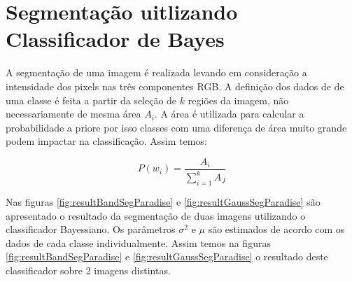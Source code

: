 \documentclass[ 
	article,			%
	11pt,				%
	oneside,			%
	a4paper,			%
	english,			%
	brazil,				%
	]{abntex2}
\begin{document}
% 
% 
% 
% 
% 

\section{Segmentação uitlizando Classificador de Bayes}
 A segmentação de uma imagem é realizada levando em
consideração a intensidade dos pixels nas três componentes RGB.
A definição dos dados de de uma classe é feita a partir da seleção de $k$
regiões da imagem, não necessariamente de mesma área $A_i$. A área é utilizada
para calcular a probabilidade a priore por isso classes com uma diferença de
área muito grande podem impactar na classificação.
Assim temos:

\begin{equation}
	P(w_i) =  \frac{A_i}{\sum_{i=1}^{k}{A_J}}
\end{equation}


Nas figuras \ref{fig:resultBandSegParadise} e \ref{fig:resultGaussSegParadise}
são apresentado o resultado da segmentação de duas imagens utilizando o
classificador Bayessiano. Os parâmetros $\sigma^2$ e $\mu$ são estimados de
acordo com os dados de cada classe individualmente. Assim temos na figuras
\ref{fig:resultBandSegParadise} e \ref{fig:resultGaussSegParadise} o resultado
deste classificador sobre 2 imagens distintas.
\end{document}
